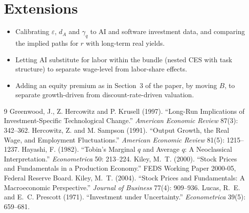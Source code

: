 \documentclass[11pt]{article}
\newcommand{\e}{\varepsilon}
\begin{document}
\section{Extensions}
\begin{itemize}
\item Calibrating $\e$, $d_A$ and $\gamma_q$ to AI and software investment data, and
comparing the implied paths for $r$ with long-term real yields.
\item Letting AI substitute for labor within the bundle (nested CES with task
structure) to separate wage-level from labor-share effects.
\item Adding an equity premium as in Section~3 of the paper, by moving $B$, to separate
growth-driven from discount-rate-driven valuation.
\end{itemize}

\begin{thebibliography}{9}
Greenwood, J., Z. Hercowitz and P. Krusell (1997). ``Long-Run Implications of
Investment-Specific Technological Change.'' \emph{American Economic Review} 87(3): 342--362.
Hercowitz, Z. and M. Sampson (1991). ``Output Growth, the Real Wage, and Employment
Fluctuations.'' \emph{American Economic Review} 81(5): 1215--1237.
Hayashi, F. (1982). ``Tobin's Marginal $q$ and Average $q$: A Neoclassical Interpretation.''
\emph{Econometrica} 50: 213--224.
Kiley, M.~T. (2000). ``Stock Prices and Fundamentals in a Production Economy.''
FEDS Working Paper 2000-05, Federal Reserve Board.
Kiley, M.~T. (2004). ``Stock Prices and Fundamentals: A Macroeconomic Perspective.''
\emph{Journal of Business} 77(4): 909--936.
Lucas, R.~E. and E.~C. Prescott (1971). ``Investment under Uncertainty.''
\emph{Econometrica} 39(5): 659--681.
\end{thebibliography}
\end{document}
